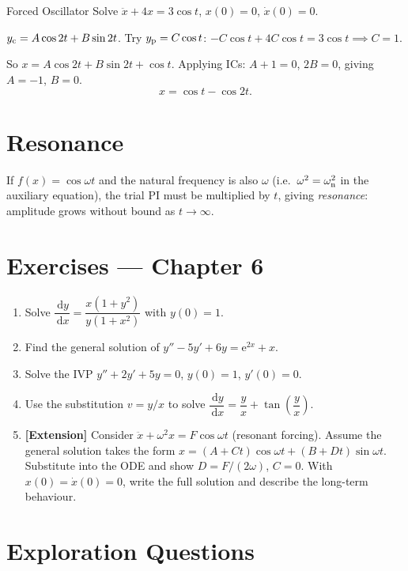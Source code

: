 \documentclass[12pt, a4paper]{book}
\newcommand{\dd}{\,\mathrm{d}}
\newcommand{\dx}{\,\mathrm{d}x}
\newcommand{\e}{\mathrm{e}}
\begin{document}
\begin{example}{Forced Oscillator}{}
Solve $\ddot{x}+4x=3\cos t$, $x(0)=0$, $\dot{x}(0)=0$.

$y_{\rm c}=A\cos2t+B\sin2t$. Try $y_{\rm p}=C\cos t$: $-C\cos t+4C\cos t=3\cos t\implies C=1$.

So $x=A\cos2t+B\sin2t+\cos t$. Applying ICs: $A+1=0$, $2B=0$, giving $A=-1$, $B=0$.
\[
x=\cos t-\cos2t.
\]
\end{example}

\section{Resonance}

If $f(x)=\cos\omega t$ and the natural frequency is also $\omega$ (i.e.\ $\omega^2=\omega_{\rm n}^2$ in the auxiliary equation), the trial PI must be multiplied by $t$, giving \emph{resonance}: amplitude grows without bound as $t\to\infty$.

\section*{Exercises --- Chapter 6}
\begin{enumerate}[label=\textbf{\arabic*.}]
  \item Solve $\dfrac{\dd y}{\dx}=\dfrac{x(1+y^2)}{y(1+x^2)}$ with $y(0)=1$.
  \item Find the general solution of $y''-5y'+6y=\e^{2x}+x$.
  \item Solve the IVP $y''+2y'+5y=0$, $y(0)=1$, $y'(0)=0$.
  \item Use the substitution $v=y/x$ to solve $\dfrac{\dd y}{\dx}=\dfrac{y}{x}+\tan\!\left(\dfrac{y}{x}\right)$.
  \item \textbf{[Extension]} Consider $\ddot{x}+\omega^2 x=F\cos\omega t$ (resonant forcing). Assume the general solution takes the form $x=(A+Ct)\cos\omega t+(B+Dt)\sin\omega t$. Substitute into the ODE and show $D=F/(2\omega)$, $C=0$. With $x(0)=\dot{x}(0)=0$, write the full solution and describe the long-term behaviour.
\end{enumerate}

\newpage

\section*{Exploration Questions}

\hrulefill
\end{document}
